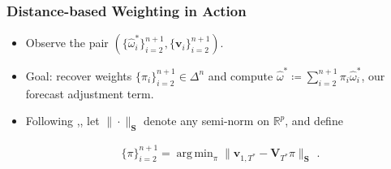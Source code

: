 \documentclass[9pt]{beamer}
\newcommand{\weight}{\pi}
\newcommand{\V}{\textbf{V}}
\DeclareMathOperator*{\argmin}{arg\,min} %
\theoremstyle{definition}
\begin{document}
    \begin{frame}
    \frametitle{Distance-based Weighting in Action}
    
    \begin{itemize}
    
    \item <1->  Observe the pair $(\{\hat\omega^{*}_{i}\}^{n+1}_{i=2},\{\textbf{v}_{i}\}^{n+1}_{i=2})$.  \\
    
    \item <2-> Goal: recover weights $\{\weight_{i}\}^{n+1}_{i=2} \in \Delta^{n}$ and compute $\hat\omega^{*} \coloneq \sum^{n+1}_{i=2}\weight_{i}\hat\omega^{*}_{i}$, our forecast adjustment term.
    
    \item <3-> Following \cite[][]{abadie2003economic},\cite[][]{abadie2010synthetic}, let $\|\cdot\|_{\textbf{S}}$ denote any semi-norm on $\mathbb{R}^{p}$, and define
    
    
    \begin{align*}
    \{\pi\}_{i=2}^{n+1} = \argmin_{\pi}\|\textbf{v}_{1,T^{*}} - \V_{T^{*}}\pi \|_{\textbf{S}} \text{ .}
    \end{align*}
    
    
    \end{itemize}
    \end{frame}


       
\end{document}
